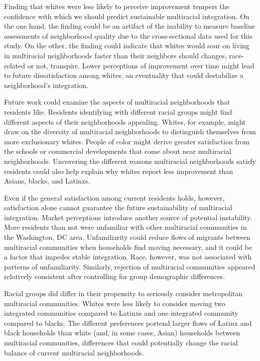 \documentclass{baderart}
\begin{document}
Finding that whites were less likely to perceive improvement tempers the confidence with which we should predict sustainable multiracial integration. On the one hand, the finding could be an artifact of the inability to measure baseline assessments of neighborhood quality due to the cross-sectional data used for this study. On the other, the finding could indicate that whites would sour on living in multiracial neighborhoods faster than their neighbors should changes, race-related or not, transpire. Lower perceptions of improvement over time might lead to future dissatisfaction among whites, an eventuality that could destabilize a neighborhood's integration.

Future work could examine the aspects of multiracial neighborhoods that residents like. Residents identifying with different racial groups might find different aspects of their neighborhoods appealing. Whites, for example, might draw on the diversity of multiracial neighborhoods to distinguish themselves from more exclusionary whites. People of color might derive greater satisfaction from the schools or commercial developments that come about near multiracial neighborhoods. Uncovering the different reasons multiracial neighborhoods satisfy residents could also help explain why whites report less improvement than Asians, blacks, and Latinxs. 

Even if the general satisfaction among current residents holds, however, satisfaction alone cannot guarantee the future sustainability of multiracial integration. Market perceptions introduce another source of potential instability. More residents than not were unfamiliar with other multiracial communities in the Washington, DC area. Unfamiliarity could reduce flows of migrants between multiracial communities when households find moving necessary, and it could be a factor that impedes stable integration. Race, however, was not associated with patterns of unfamiliarity. Similarly, rejection of multiracial communities appeared relatively consistent after controlling for group demographic differences. 

Racial groups did differ in their propensity to seriously consider metropolitan multiracial communities. Whites were less likely to consider moving two integrated communities compared to Latinxs and one integrated community compared to blacks. The different preferences portend larger flows of Latinx and black households than white (and, in some cases, Asian) households between multiracial communities, differences that could potentially change the racial balance of current multiracial neighborhoods. 
\end{document}
